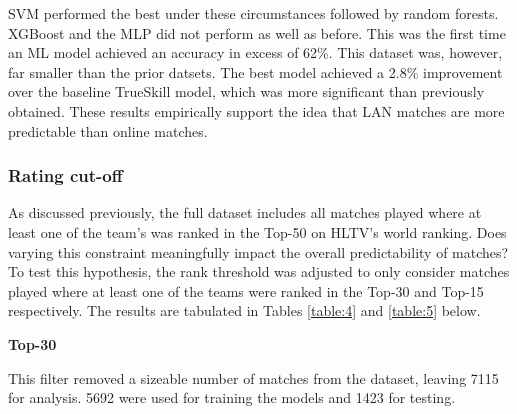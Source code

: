 SVM performed the best under these circumstances followed by random forests. XGBoost and the MLP did not perform as well as before. This was the first time an ML model achieved an accuracy in excess of 62\%. This dataset was, however, far smaller than the prior datsets. The best model achieved a 2.8\% improvement over the baseline TrueSkill model, which was more significant than previously obtained. These results empirically support the idea that LAN matches are more predictable than online matches.


\subsubsection{Rating cut-off}

As discussed previously, the full dataset includes all matches played where at least one of the team's was ranked in the Top-50 on HLTV's world ranking. Does varying this constraint meaningfully impact the overall predictability of matches? To test this hypothesis, the rank threshold was adjusted to only consider matches played where at least one of the teams were ranked in the Top-30 and Top-15 respectively. The results are tabulated in Tables \ref{table:4} and \ref{table:5} below.

\textbf{Top-30}

This filter removed a sizeable number of matches from the dataset, leaving 7115 for analysis. 5692 were used for training the models and 1423 for testing.

